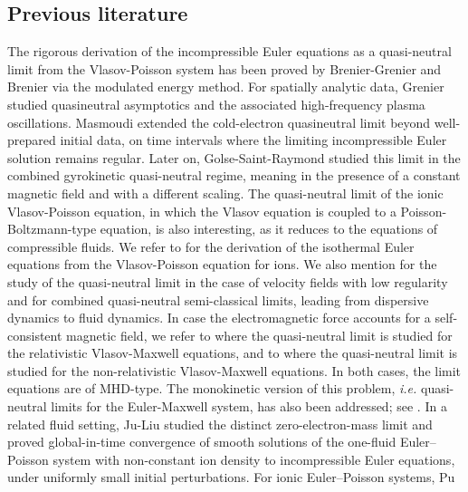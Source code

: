 \documentclass[11pt,reqno]{amsart}
\numberwithin{equation}{section}
\begin{document}
\subsection{Previous literature} 
The rigorous derivation of the incompressible Euler equations as a quasi-neutral limit from the Vlasov-Poisson system has been proved by Brenier-Grenier \cite{brenier1994limite} and Brenier  \cite{brenier2000convergence} via the modulated energy method. For spatially analytic data, Grenier
\cite{grenier1996oscillations} studied quasineutral asymptotics
and the associated high-frequency plasma oscillations.
Masmoudi \cite{masmoudi2001vlasov} extended the cold-electron
quasineutral limit beyond well-prepared initial data,
on time intervals where the limiting incompressible Euler
solution remains regular. Later on,  Golse-Saint-Raymond \cite{golse2003vlasov} studied this limit in the combined gyrokinetic quasi-neutral regime, meaning in the presence of a constant magnetic field and with a different scaling. The quasi-neutral limit of the ionic Vlasov-Poisson equation, in which the Vlasov equation is coupled to a Poisson-Boltzmann-type equation, is also interesting, as it reduces to the equations of compressible fluids. 
We refer to \cite{han2011quasineutral, han2014quasineutral} for the derivation of the isothermal Euler equations from the Vlasov-Poisson equation for ions. 
We also mention \cite{ben2025derivation} for the study of the quasi-neutral limit in the case of velocity fields with low regularity and  \cite{rosenzweig2021quantum, puel2002convergence,jungel2003convergence} for combined quasi-neutral semi-classical limits, leading from dispersive dynamics to fluid dynamics.  
In case the electromagnetic force accounts for a self-consistent magnetic field, we refer to  \cite{puel2004quasineutral,gagnebin2025relativistic} where the quasi-neutral limit is studied for the relativistic Vlasov-Maxwell equations,  and to \cite{brenier2003incompressible} where 
the quasi-neutral limit is studied for the non-relativistic Vlasov-Maxwell equations. 
In both cases, the limit equations are of MHD-type.  
The monokinetic version of this problem, {\it i.e.} quasi-neutral limits for the 
Euler-Maxwell system, has also been addressed; see \cite{Peng2024, Peng2017}.  In a related fluid setting, Ju-Liu \cite{ju2026zero}
studied the distinct zero-electron-mass limit and proved
global-in-time convergence of smooth solutions of the
one-fluid Euler--Poisson system with non-constant ion density
to incompressible Euler equations, under uniformly
small initial perturbations. For ionic Euler--Poisson systems, Pu
\end{document}

